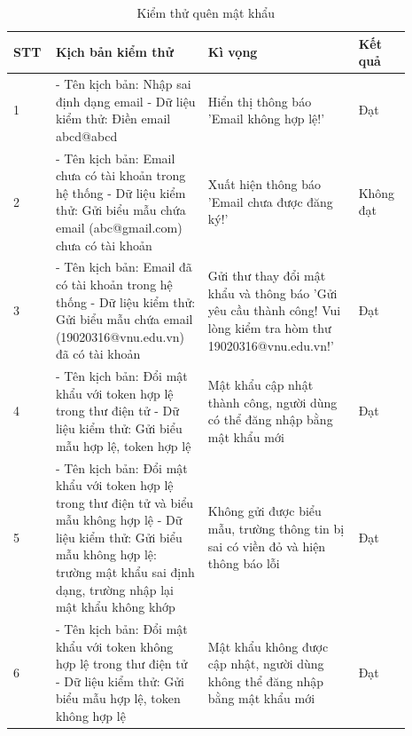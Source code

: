 \documentclass[./../main.tex]{subfiles}
\begin{document}
\begin{longtable}{| p{0.07\linewidth} | p{0.35\linewidth} | p{0.35\linewidth} | p{0.12\linewidth} |}
\caption{Kiểm thử quên mật khẩu} \label{test-case-2}
\hline
\textbf{STT} & \textbf{Kịch bản kiểm thử} & \textbf{Kì vọng} & \textbf{Kết quả}
\\ \hline
    \centerline{1} & 
    - Tên kịch bản: Nhập sai định dạng email \newline
    - Dữ liệu kiểm thử: Điền email abcd@abcd &
    Hiển thị thông báo 'Email không hợp lệ!' &
    \centerline{Đạt}
\\ \hline 
    \centerline{2} & 
    - Tên kịch bản: Email chưa có tài khoản trong hệ thống \newline
    - Dữ liệu kiểm thử: Gửi biểu mẫu chứa email (abc@gmail.com) chưa có tài khoản &
    Xuất hiện thông báo 'Email chưa được đăng ký!'  &
    \centerline{Không đạt}
\\ \hline
    \centerline{3} & 
    - Tên kịch bản: Email đã có tài khoản trong hệ thống \newline
    - Dữ liệu kiểm thử: Gửi biểu mẫu chứa email (19020316@vnu.edu.vn) đã có tài khoản &
    Gửi thư thay đổi mật khẩu và thông báo 'Gửi yêu cầu thành công! Vui lòng kiểm tra hòm thư 19020316@vnu.edu.vn!'  &
    \centerline{Đạt}
\\ \hline
    \centerline{4} & 
    - Tên kịch bản: Đổi mật khẩu với token hợp lệ trong thư điện tử \newline
    - Dữ liệu kiểm thử: Gửi biểu mẫu hợp lệ, token hợp lệ &
    Mật khẩu cập nhật thành công, người dùng có thể đăng nhập bằng mật khẩu mới &
    \centerline{Đạt}
\\ \hline
    \centerline{5} & 
    - Tên kịch bản: Đổi mật khẩu với token hợp lệ trong thư điện tử và biểu mẫu không hợp lệ\newline
    - Dữ liệu kiểm thử: Gửi biểu mẫu không hợp lệ: trường mật khẩu sai định dạng, trường nhập lại mật khẩu không khớp &
    Không gửi được biểu mẫu, trường thông tin bị sai có viền đỏ và hiện thông báo lỗi &
    \centerline{Đạt}
\\ \hline
    \centerline{6} & 
    - Tên kịch bản: Đổi mật khẩu với token không hợp lệ trong thư điện tử \newline
    - Dữ liệu kiểm thử: Gửi biểu mẫu hợp lệ, token không hợp lệ &
    Mật khẩu không được cập nhật, người dùng không thể đăng nhập bằng mật khẩu mới &
    \centerline{Đạt}
\\ \hline
\end{longtable}
\end{document}
